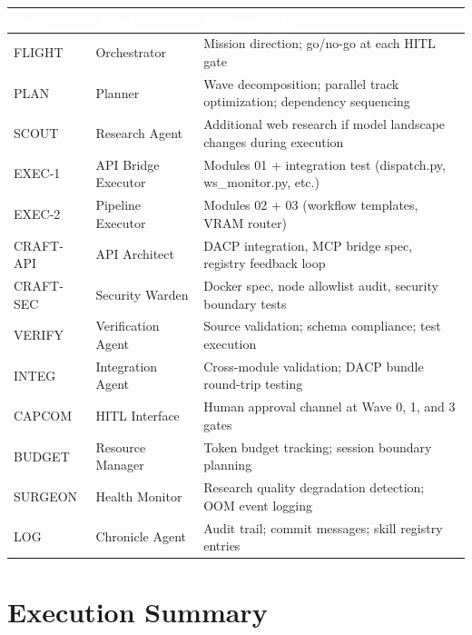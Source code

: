 \documentclass[11pt,letterpaper]{article}
\newcommand{\tableheader}[1]{\textbf{\sffamily\textcolor{white}{#1}}}
\begin{document}
\begin{center}
\begin{tabularx}{\textwidth}{L{2cm}L{3cm}X}
\toprule
{}
\tableheader{Role} & \tableheader{Agent} & \tableheader{Responsibility} \\
\midrule
FLIGHT & Orchestrator & Mission direction; go/no-go at each HITL gate \\
PLAN & Planner & Wave decomposition; parallel track optimization; dependency sequencing \\
SCOUT & Research Agent & Additional web research if model landscape changes during execution \\
EXEC-1 & API Bridge Executor & Modules 01 + integration test (dispatch.py, ws\_monitor.py, etc.) \\
EXEC-2 & Pipeline Executor & Modules 02 + 03 (workflow templates, VRAM router) \\
CRAFT-API & API Architect & DACP integration, MCP bridge spec, registry feedback loop \\
CRAFT-SEC & Security Warden & Docker spec, node allowlist audit, security boundary tests \\
VERIFY & Verification Agent & Source validation; schema compliance; test execution \\
INTEG & Integration Agent & Cross-module validation; DACP bundle round-trip testing \\
CAPCOM & HITL Interface & Human approval channel at Wave 0, 1, and 3 gates \\
BUDGET & Resource Manager & Token budget tracking; session boundary planning \\
SURGEON & Health Monitor & Research quality degradation detection; OOM event logging \\
LOG & Chronicle Agent & Audit trail; commit messages; skill registry entries \\
\bottomrule
\end{tabularx}
\end{center}

\section{Execution Summary}
\end{document}

